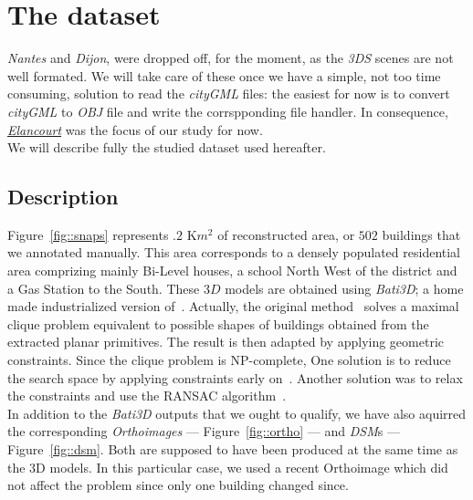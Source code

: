 \documentclass[../main.tex]{subfiles}
\begin{document}
    \section{The dataset}

    \textit{Nantes} and \textit{Dijon}, were dropped off, for the moment, as the \textit{3DS} scenes are not well formated. We will take care of these once we have a simple, not too time consuming, solution to read the \textit{cityGML} files: the easiest for now is to convert \textit{cityGML} to \textit{OBJ} file and write the corrspponding file handler. In consequence, \href{https://www.google.fr/maps/place/%C3%89lancourt/@48.7781732,1.9536264,5868m/data=!3m1!1e3!4m13!1m7!3m6!1s0x47e68370e965167b:0x705d83a4167c877c!2s%C3%89lancourt!3b1!8m2!3d48.782907!4d1.960077!3m4!1s0x47e68370e965167b:0x705d83a4167c877c!8m2!3d48.782907!4d1.960077}{\textit{Elancourt}} was the focus of our study for now.\\

    We will describe fully the studied dataset used hereafter.

    \subsection{Description}

    Figure~\ref{fig::snaps} represents $.2\text{ K}m^2$ of reconstructed area, or $502$ buildings that we annotated manually. This area corresponds to a densely populated residential area comprizing mainly Bi-Level houses, a school North West of the district and a Gas Station to the South. These $3D$ models are obtained using \textit{Bati3D}; a home made industrialized version of~\cite{durupt2006automatic, taillandier2004automatic, taillandier2005}. Actually, the original method~\cite{taillandier2004automatic} solves a maximal clique problem equivalent to possible shapes of buildings obtained from the extracted planar primitives. The result is then adapted by applying geometric constraints. Since the clique problem is NP-complete, One solution is to reduce the search space by applying constraints early on~\cite{taillandier2005}. Another solution was to relax the constraints and use the RANSAC algorithm~\cite{Fischler:1981:RSC:358669.358692}.\\

    In addition to the \textit{Bati3D} outputs that we ought to qualify, we have also aquirred the corresponding \textit{Orthoimages} --- Figure~\ref{fig::ortho} --- and \textit{DSM}s --- Figure~\ref{fig::dsm}. Both are supposed to have been produced at the same time as the 3D models. In this particular case, we used a recent Orthoimage which did not affect the problem since only one building changed since.
\end{document}
